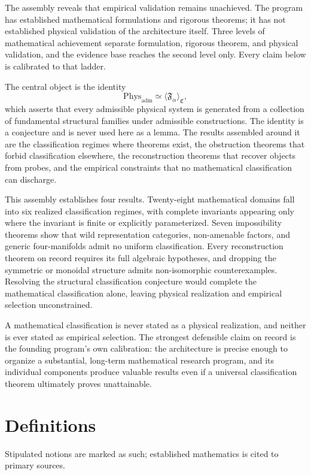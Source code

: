 \documentclass[11pt,letterpaper]{article}
\theoremstyle{definition}
\begin{document}
The assembly reveals that empirical validation remains unachieved. The program has established mathematical formulations and rigorous theorems; it has not established physical validation of the architecture itself. Three levels of mathematical achievement separate formulation, rigorous theorem, and physical validation, and the evidence base reaches the second level only. Every claim below is calibrated to that ladder.

The central object is the identity
\[
  \mathrm{Phys}_{\mathrm{adm}} \simeq \langle \mathfrak{F}_\alpha \rangle_{\mathfrak{C}},
\]
which asserts that every admissible physical system is generated from a collection of fundamental structural families under admissible constructions. The identity is a conjecture and is never used here as a lemma. The results assembled around it are the classification regimes where theorems exist, the obstruction theorems that forbid classification elsewhere, the reconstruction theorems that recover objects from probes, and the empirical constraints that no mathematical classification can discharge.

This assembly establishes four results. Twenty-eight mathematical domains fall into six realized classification regimes, with complete invariants appearing only where the invariant is finite or explicitly parameterized. Seven impossibility theorems show that wild representation categories, non-amenable factors, and generic four-manifolds admit no uniform classification. Every reconstruction theorem on record requires its full algebraic hypotheses, and dropping the symmetric or monoidal structure admits non-isomorphic counterexamples. Resolving the structural classification conjecture would complete the mathematical classification alone, leaving physical realization and empirical selection unconstrained.

A mathematical classification is never stated as a physical realization, and neither is ever stated as empirical selection. The strongest defensible claim on record is the founding program's own calibration: the architecture is precise enough to organize a substantial, long-term mathematical research program, and its individual components produce valuable results even if a universal classification theorem ultimately proves unattainable.

\section{Definitions}

Stipulated notions are marked as such; established mathematics is cited to primary sources.
\end{document}
